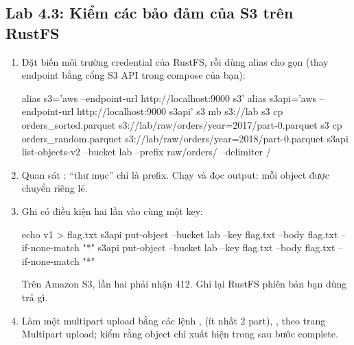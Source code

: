 \subsection{Lab 4.3: Kiểm các bảo đảm của S3 trên RustFS}
\begin{enumerate}
  \item Đặt biến môi trường credential của RustFS, rồi dùng alias cho gọn (thay endpoint bằng cổng S3 API trong compose của bạn):
\begin{codeblock}
alias s3='aws --endpoint-url http://localhost:9000 s3'
alias s3api='aws --endpoint-url http://localhost:9000 s3api'
s3 mb s3://lab
s3 cp orders_sorted.parquet s3://lab/raw/orders/year=2017/part-0.parquet
s3 cp orders_random.parquet s3://lab/raw/orders/year=2018/part-0.parquet
s3api list-objects-v2 --bucket lab --prefix raw/orders/ --delimiter /
\end{codeblock}
  \item Quan sát : ``thư mục'' chỉ là prefix. Chạy  và đọc output: mỗi object được chuyển riêng lẻ.
  \item Ghi có điều kiện hai lần vào cùng một key:
\begin{codeblock}
echo v1 > flag.txt
s3api put-object --bucket lab --key flag.txt --body flag.txt --if-none-match "*"
s3api put-object --bucket lab --key flag.txt --body flag.txt --if-none-match "*"
\end{codeblock}
  Trên Amazon S3, lần hai phải nhận 412. Ghi lại RustFS phiên bản bạn dùng trả gì.
  \item Làm một multipart upload bằng các lệnh ,  (ít nhất 2 part), ,  theo trang Multipart upload; kiểm rằng object chỉ xuất hiện trong  sau bước complete.
\end{enumerate}

